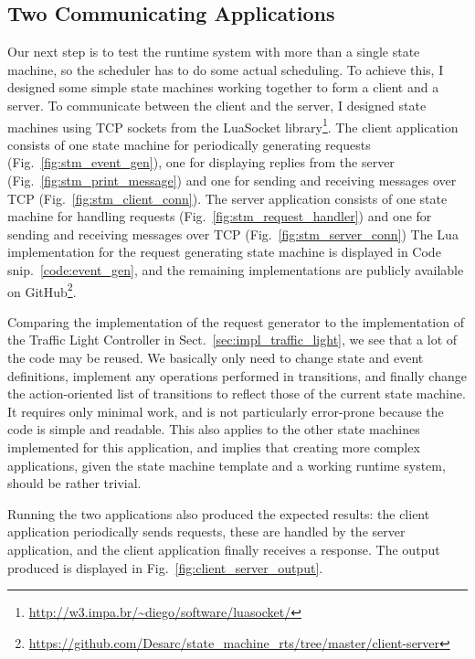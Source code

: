 \subsection{Two Communicating Applications}
\label{sec:client_server_app}
Our next step is to test the runtime system with more than a single state machine, so the scheduler has to do some actual scheduling. To achieve this, I designed some simple state machines working together to form a client and a server. To communicate between the client and the server, I designed state machines using TCP sockets from the LuaSocket library\footnote{\url{http://w3.impa.br/~diego/software/luasocket/}}. The client application consists of one state machine for periodically generating requests (Fig.~\ref{fig:stm_event_gen}), one for displaying replies from the server (Fig.~\ref{fig:stm_print_message}) and one for sending and receiving messages over TCP (Fig.~\ref{fig:stm_client_conn}). The server application consists of one state machine for handling requests (Fig.~\ref{fig:stm_request_handler}) and one for sending and receiving messages over TCP (Fig.~\ref{fig:stm_server_conn})
The Lua implementation for the request generating state machine is displayed in Code snip.~\ref{code:event_gen}, and the remaining implementations are publicly available on GitHub\footnote{\url{https://github.com/Desarc/state_machine_rts/tree/master/client-server}}.

Comparing the implementation of the request generator to the implementation of the Traffic Light Controller in Sect.~\ref{sec:impl_traffic_light}, we see that a lot of the code may be reused. We basically only need to change state and event definitions, implement any operations performed in transitions, and finally change the action-oriented list of transitions to reflect those of the current state machine. It requires only minimal work, and is not particularly error-prone because the code is simple and readable. This also applies to the other state machines implemented for this application, and implies that creating more complex applications, given the state machine template and a working runtime system, should be rather trivial.

Running the two applications also produced the expected results: the client application periodically sends requests, these are handled by the server application, and the client application finally receives a response. The output produced is displayed in Fig.~\ref{fig:client_server_output}.


